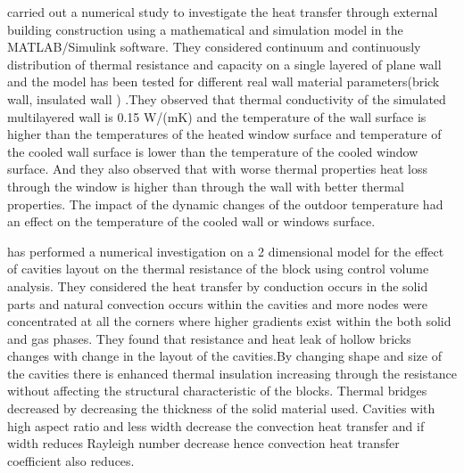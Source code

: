 \documentclass{article}
\begin{document}
\begin{multicols}{2}
\textcite{pitel2019dynamic} carried out a numerical study to investigate the heat transfer through external building construction using a mathematical and simulation model in the MATLAB/Simulink software. They considered continuum and continuously distribution of thermal resistance and capacity on a single layered of plane wall and the model has been tested for different real wall material parameters(brick wall, insulated wall ) .They observed that thermal conductivity of the simulated multilayered wall is 0.15 W/(mK) and the temperature of the wall surface is higher than the temperatures of the heated window surface and temperature of the cooled wall surface is lower than the temperature of the cooled window surface. And they also observed that with worse thermal properties heat loss through the window is higher than through the wall with better thermal properties.  The impact of the dynamic changes of the outdoor temperature had an effect on the temperature of the cooled wall or windows surface.

\textcite{baig2008conduction} has performed a numerical investigation on a 2 dimensional model for the effect of cavities layout on the thermal resistance of the block using control volume analysis. They considered the heat transfer by conduction occurs in the solid parts and natural convection occurs within the cavities and more nodes were concentrated at all the corners where higher gradients exist within the both solid and gas phases. They found that resistance  and heat leak of hollow bricks changes with change in the layout of the cavities.By changing shape and size of the cavities there is enhanced thermal insulation increasing through the resistance without affecting the structural characteristic of the blocks. Thermal bridges decreased by decreasing the thickness of the solid material used. Cavities with high aspect ratio and less width decrease the convection heat transfer and if width reduces Rayleigh number decrease hence convection heat transfer coefficient also reduces.


\end{multicols}
\end{document}
